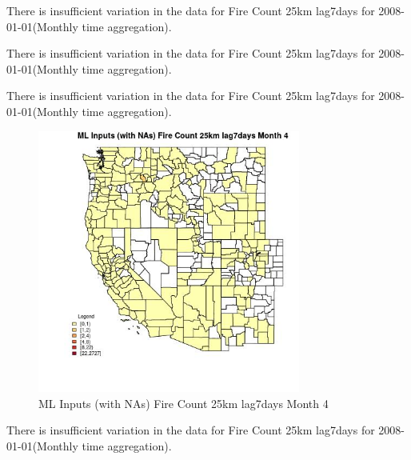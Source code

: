 There is insufficient variation in the data for Fire Count 25km lag7days for 2008-01-01(Monthly time aggregation). 
 

There is insufficient variation in the data for Fire Count 25km lag7days for 2008-01-01(Monthly time aggregation). 
 

There is insufficient variation in the data for Fire Count 25km lag7days for 2008-01-01(Monthly time aggregation). 
 

\begin{figure} 
\centering  
\includegraphics[width=0.77\textwidth]{Code_Outputs/Report_ML_input_PM25_Step4_part_f_de_duplicated_aves_prioritize_24hr_obswNAs_CountyFire_Count_25km_lag7daysmedianMonth4.jpg} 
\caption{\label{fig:Report_ML_input_PM25_Step4_part_f_de_duplicated_aves_prioritize_24hr_obswNAsCountyFire_Count_25km_lag7daysmedianMonth4}ML Inputs (with NAs) Fire Count 25km lag7days Month 4} 
\end{figure} 
 

There is insufficient variation in the data for Fire Count 25km lag7days for 2008-01-01(Monthly time aggregation). 
 

